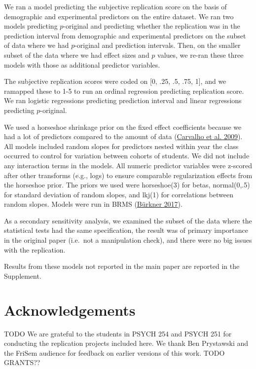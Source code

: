 \documentclass[
  english,
  a4paper,
]{article}
\begin{document}
We ran a model predicting the subjective replication score on the basis of demographic and experimental predictors on the entire dataset. We ran two models predicting \(p\)-original and predicting whether the replication was in the prediction interval from demographic and experimental predictors on the subset of data where we had \(p\)-original and prediction intervals. Then, on the smaller subset of the data where we had effect sizes and \(p\) values, we re-ran these three models with those as additional predictor variables.

The subjective replication scores were coded on {[}0, .25, .5, .75, 1{]}, and we ramapped these to 1-5 to run an ordinal regression predicting replication score. We ran logistic regressions predicting prediction interval and linear regressions predicting \(p\)-original.

We used a horseshoe shrinkage prior on the fixed effect coefficients because we had a lot of predictors compared to the amount of data (\protect\hyperlink{ref-carvalho09}{Carvalho et al. 2009}). All models included random slopes for predictors nested within year the class occurred to control for variation between cohorts of students. We did not include any interaction terms in the models. All numeric predictor variables were z-scored after other transforms (e.g., logs) to ensure comparable regularization effects from the horseshoe prior. The priors we used were horseshoe(3) for betas, normal(0,.5) for standard deviation of random slopes, and lkj(1) for correlations between random slopes. Models were run in BRMS (\protect\hyperlink{ref-brms}{Bürkner 2017}).

As a secondary sensitivity analysis, we examined the subset of the data where the statistical tests had the same specification, the result was of primary importance in the original paper (i.e.~not a manipulation check), and there were no big issues with the replication.

Results from these models not reported in the main paper are reported in the Supplement.

\hypertarget{acknowledgements}{%
\section*{Acknowledgements}\label{acknowledgements}}

TODO We are grateful to the students in PSYCH 254 and PSYCH 251 for conducting the replication projects included here. We thank Ben Prystawski and the FriSem audience for feedback on earlier versions of this work. TODO GRANTS??
\end{document}
